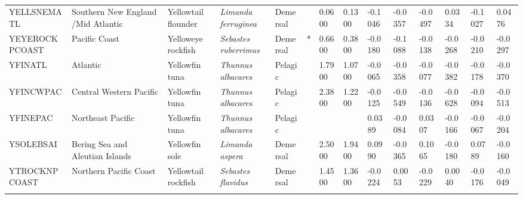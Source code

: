 \begin{longtable}{p{2.8cm}p{2cm}p{1.7cm}p{1.7cm}p{1cm}p{0.3cm}p{1cm}p{1cm}p{1cm}p{1cm}p{1cm}p{1cm}p{1cm}p{1cm}}
  YELLSNEMATL & Southern New England /Mid Atlantic & Yellowtail flounder & \textit{Limanda ferruginea} & Demersal &   & 0.0600 & 0.1300 & -0.1046 & -0.0357 & -0.0497 & 0.0334 & -0.1027 & 0.0476 \\ 
  YEYEROCKPCOAST & Pacific Coast & Yelloweye rockfish & \textit{Sebastes ruberrimus} & Demersal & * & 0.6600 & 0.3800 & -0.0180 & -0.1088 & -0.0138 & -0.0268 & -0.0210 & -0.0297 \\ 
  YFINATL & Atlantic & Yellowfin tuna & \textit{Thunnus albacares} & Pelagic &   & 1.7900 & 1.0700 & -0.0065 & -0.0358 & -0.0077 & -0.0382 & -0.0178 & -0.0370 \\ 
  YFINCWPAC & Central Western Pacific & Yellowfin tuna & \textit{Thunnus albacares} & Pelagic &   & 2.3800 & 1.2200 & -0.0125 & -0.0549 & -0.0136 & -0.0628 & -0.0094 & -0.0513 \\ 
  YFINEPAC & Northeast Pacific & Yellowfin tuna & \textit{Thunnus albacares} & Pelagic &  &  &  & 0.0389 & -0.0084 & 0.0307 & -0.0166 & -0.0067 & -0.0204 \\ 
  YSOLEBSAI & Bering Sea and Aleutian Islands & Yellowfin sole & \textit{Limanda aspera} & Demersal &   & 2.5000 & 1.9400 & 0.0990 & -0.0365 & 0.1065 & -0.0180 & 0.0789 & -0.0160 \\ 
  YTROCKNPCOAST & Northern Pacific Coast & Yellowtail rockfish & \textit{Sebastes flavidus} & Demersal &   & 1.4500 & 1.3600 & -0.0224 & 0.0053 & -0.0229 & 0.0040 & -0.0176 & -0.0049 \\ 
   \hline
\hline
\caption{}
\label{tab:S1}
\end{longtable}
